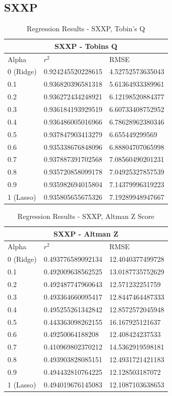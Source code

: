 \subsection{SXXP}
\begin{table}[h!]
\centering
\begin{tabular}{ |p{2.5cm}||p{4cm}|p{4cm}| }
 \hline
 \multicolumn{3}{|c|}{SXXP - Tobins Q} \\
 \hline
 Alpha & $r^2$ & RMSE \\
 \hline
0 (Ridge) & 0.924245520228615 & 4.52752573635043\\
0.1 & 0.936820396581318 & 5.61364933389961\\
0.2 & 0.936272434248921 & 6.12198520884377\\
0.3 & 0.936184193929519 & 6.60733408752952\\
0.4 & 0.936486005016966 & 6.78628962380346\\
0.5 & 0.937847903413279 & 6.655449299569\\
0.6 & 0.935338676848096 & 6.88804707065998\\
\rowcolor{gray}0.7 & 0.937887391702568 & 7.08560490201231\\
0.8 & 0.935720858099178 & 7.04925327857539\\
0.9 & 0.935982694015804 & 7.14379996319223\\
1 (Lasso) & 0.935805655675326 & 7.19289948947667\\
 \hline
\end{tabular}
\caption{Regression Results  - SXXP, Tobin's Q}
\end{table}

\begin{table}[h!]
\centering
\begin{tabular}{ |p{2.5cm}||p{4cm}|p{4cm}| }
 \hline
 \multicolumn{3}{|c|}{SXXP - Altman Z} \\
 \hline
 Alpha & $r^2$ & RMSE \\
 \hline
0 (Ridge) & 0.493776589092134 & 12.4040377499728\\
0.1 & 0.492009638562525 & 13.0187735752629\\
0.2 & 0.492487747960643 & 12.571232251759\\
0.3 & 0.493364660095417 & 12.8447464487333\\
\rowcolor{gray}0.4 & 0.495255261342842 & 12.8572572045948\\
0.5 & 0.443363098262155 & 16.167925121637\\
0.6 & 0.49250064188208 & 12.408424237533\\
0.7 & 0.410969802370212 & 14.5362919598181\\
0.8 & 0.493903828085151 & 12.4931721421183\\
0.9 & 0.494432810764225 & 12.128503187072\\
1 (Lasso) & 0.494019676145083 & 12.1087103638653\\
 \hline
\end{tabular}
\caption{Regression Results  - SXXP, Altman Z Score}
\end{table}
\clearpage


